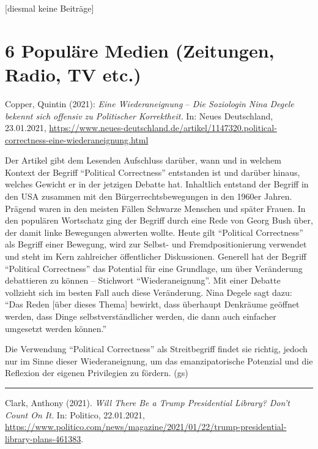 \documentclass[a4paper,
fontsize=11pt,
oneside,
numbers=noperiodatend,
parskip=half-,
bibliography=totoc,
final
]{scrartcl}
\begin{document}
{[}diesmal keine Beiträge{]}

\hypertarget{populuxe4re-medien-zeitungen-radio-tv-etc.}{%
\section{6 Populäre Medien (Zeitungen, Radio, TV
etc.)}\label{populuxe4re-medien-zeitungen-radio-tv-etc.}}

Copper, Quintin (2021): \emph{Eine Wiederaneignung} -- \emph{Die
Soziologin Nina Degele bekennt sich offensiv zu Politischer
Korrektheit.} In: Neues Deutschland, 23.01.2021,
\url{https://www.neues-deutschland.de/artikel/1147320.political-correctness-eine-wiederaneignung.html}

Der Artikel gibt dem Lesenden Aufschluss darüber, wann und in welchem
Kontext der Begriff \enquote{Political Correctness} entstanden ist und
darüber hinaus, welches Gewicht er in der jetzigen Debatte hat.
Inhaltlich entstand der Begriff in den USA zusammen mit den
Bürgerrechtsbewegungen in den 1960er Jahren. Prägend waren in den
meisten Fällen Schwarze Menschen und später Frauen. In den populären
Wortschatz ging der Begriff durch eine Rede von Georg Bush über, der
damit linke Bewegungen abwerten wollte. Heute gilt \enquote{Political
Correctness} als Begriff einer Bewegung, wird zur Selbst- und
Fremdpositionierung verwendet und steht im Kern zahlreicher öffentlicher
Diskussionen. Generell hat der Begriff \enquote{Political Correctness}
das Potential für eine Grundlage, um über Veränderung debattieren zu
können -- Stichwort \enquote{Wiederaneignung}. Mit einer Debatte
vollzieht sich im besten Fall auch diese Veränderung. Nina Degele sagt
dazu: \enquote{Das Reden {[}über dieses Thema{]} bewirkt, dass überhaupt
Denkräume geöffnet werden, dass Dinge selbstverständlicher werden, die
dann auch einfacher umgesetzt werden können.}

Die Verwendung \enquote{Political Correctness} als Streitbegriff findet
sie richtig, jedoch nur im Sinne dieser Wiederaneignung, um das
emanzipatorische Potenzial und die Reflexion der eigenen Privilegien zu
fördern. (gs)

\begin{center}\rule{0.5\linewidth}{0.5pt}\end{center}

Clark, Anthony (2021). \emph{Will There Be a Trump Presidential Library?
Don't Count On It.} In: Politico, 22.01.2021,
\url{https://www.politico.com/news/magazine/2021/01/22/trump-presidential-library-plans-461383}.
\end{document}
